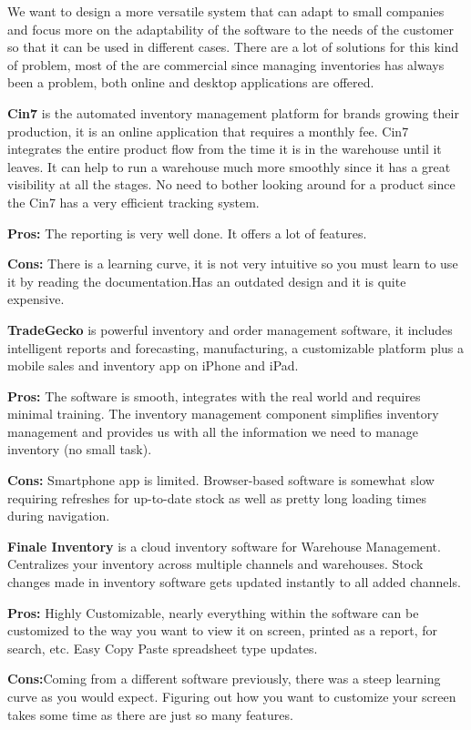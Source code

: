 We want to design a more versatile system that can adapt to small companies and focus more on the adaptability of the software to the needs of the customer so that it can be used in different cases. There are a lot of  solutions for this kind of problem, most of the are commercial since managing inventories has always been a problem, both online and desktop applications are offered.

\textbf{Cin7} is the automated inventory management platform for brands growing their production, it is an online application that requires a monthly fee.
Cin7 integrates the entire product flow from the time it is in the warehouse until it leaves. It can help to run a warehouse much more smoothly since it has a great visibility at all the stages. No need to bother looking around for a product since the Cin7 has a very efficient tracking system.

\textbf{Pros:} The reporting is very well done. It offers a lot of features.

\textbf{Cons:} There is a learning curve, it is not very intuitive so you must learn to use it by reading the documentation.Has an outdated design and it is quite expensive.

\textbf{TradeGecko} is powerful inventory and order management software, it includes intelligent reports and forecasting, manufacturing, a customizable platform plus a mobile sales and inventory app on iPhone and iPad.

\textbf{Pros:} The software is smooth, integrates with the real world and requires minimal training. The inventory management component simplifies inventory management and provides us with all the information we need to manage inventory (no small task).

\textbf{Cons:} Smartphone app is limited. Browser-based software is somewhat slow requiring refreshes for up-to-date stock as well as pretty long loading times during navigation.

\textbf{Finale Inventory} is a cloud inventory software for Warehouse Management. Centralizes your inventory across multiple channels and warehouses. Stock changes made in inventory software gets updated instantly to all added channels.

\textbf{Pros:} Highly Customizable, nearly everything within the software can be customized to the way you want to view it on screen, printed as a report, for search, etc. Easy Copy Paste spreadsheet type updates.

\textbf{Cons:}Coming from a different software previously, there was a steep learning curve as you would expect. Figuring out how you want to customize your screen takes some time as there are just so many features. 
